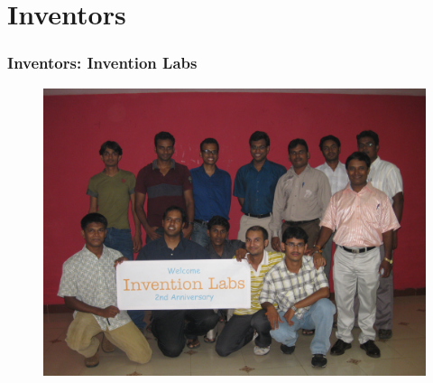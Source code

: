 \documentclass[12pt]{beamer}
\begin{document}
\section{Inventors}
\begin{frame}
	\frametitle{Inventors: Invention Labs}
	\begin{center}
		\begin{figure}[invention]
			\includegraphics[scale=0.16]{images/Invention-Labs-Team.jpg} 
		\end{figure}
	\end{center}
\end{frame}
\end{document}
